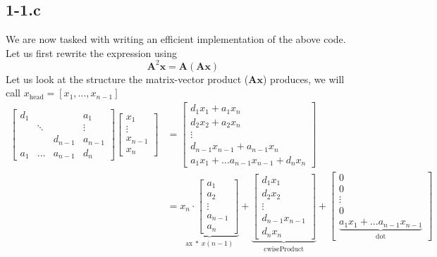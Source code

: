 \documentclass{article}
\begin{document}
\subsection*{1-1.c} 
We are now tasked with writing an efficient implementation of the above code. Let us first rewrite the expression using
\begin{equation*}
    \mathbf{A}^{2}\mathbf{x} = \mathbf{A} \left(\mathbf{A}\mathbf{x}\right)
\end{equation*}
Let us look at the structure the matrix-vector product ($\mathbf{A}\mathbf{x}$) produces, we will call $x_{\text{head}} = \left[x_{1}, \dots, x_{n-1}\right]$
\begin{align*}
    \begin{bmatrix}
        d_{1} & & & a_{1} \\
           &\ddots& &\vdots \\
         &  & d_{n-1}& a_{n-1}\\
        a_{1} & \dots & a_{n-1}& d_{n}
    \end{bmatrix}
    \begin{bmatrix}
        x_{1} \\
        \vdots \\
        x_{n-1} \\
        x_{n}
    \end{bmatrix} &= 
    \begin{bmatrix}
        d_{1}x_{1} + a_{1}x_{n} \\
        d_{2}x_{2} + a_{2}x_{n} \\
        \vdots \\
        d_{n-1}x_{n-1} + a_{n-1}x_{n} \\
        a_{1}x_{1} + \dots a_{n-1}x_{n-1} + d_{n}x_{n}
    \end{bmatrix} \\
    &= \underbrace{x_{n}\cdot\begin{bmatrix}
        a_{1} \\
        a_{2} \\
        \vdots \\
        a_{n-1} \\
        a_{n}
    \end{bmatrix}}_{\mathrm{ax}\: * \:x\left(n-1\right)} + \underbrace{\begin{bmatrix}
        d_{1}x_{1} \\
        d_{2}x_{2} \\
        \vdots \\
        d_{n-1}x_{n-1} \\
        d_{n}x_{n}
    \end{bmatrix}}_{\mathrm{cwiseProduct}} + \begin{bmatrix}
        0 \\
        0 \\
        \vdots \\
        0 \\
        \underbrace{a_{1}x_{1} + \dots a_{n-1}x_{n-1}}_{\mathrm{dot}}
    \end{bmatrix}
\end{align*}
\end{document}
